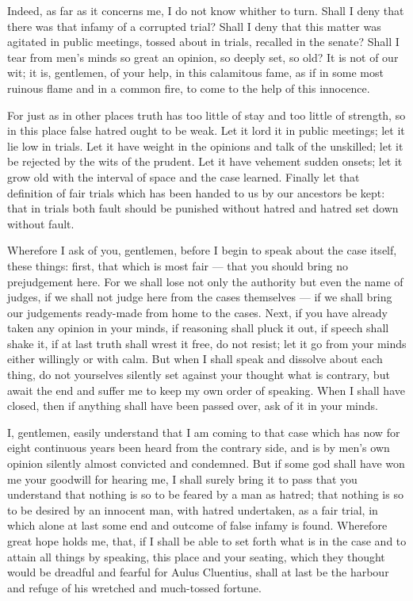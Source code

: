  Indeed, as far as it concerns me, I do not know whither to turn. Shall I deny that there was that infamy of a corrupted trial? Shall I deny that this matter was agitated in public meetings, tossed about in trials, recalled in the senate? Shall I tear from men's minds so great an opinion, so deeply set, so old? It is not of our wit; it is, gentlemen, of your help, in this calamitous fame, as if in some most ruinous flame and in a common fire, to come to the help of this innocence.

 For just as in other places truth has too little of stay and too little of strength, so in this place false hatred ought to be weak. Let it lord it in public meetings; let it lie low in trials. Let it have weight in the opinions and talk of the unskilled; let it be rejected by the wits of the prudent. Let it have vehement sudden onsets; let it grow old with the interval of space and the case learned. Finally let that definition of fair trials which has been handed to us by our ancestors be kept: that in trials both fault should be punished without hatred and hatred set down without fault.

 Wherefore I ask of you, gentlemen, before I begin to speak about the case itself, these things: first, that which is most fair --- that you should bring no prejudgement here. For we shall lose not only the authority but even the name of judges, if we shall not judge here from the cases themselves --- if we shall bring our judgements ready-made from home to the cases. Next, if you have already taken any opinion in your minds, if reasoning shall pluck it out, if speech shall shake it, if at last truth shall wrest it free, do not resist; let it go from your minds either willingly or with calm. But when I shall speak and dissolve about each thing, do not yourselves silently set against your thought what is contrary, but await the end and suffer me to keep my own order of speaking. When I shall have closed, then if anything shall have been passed over, ask of it in your minds.

 I, gentlemen, easily understand that I am coming to that case which has now for eight continuous years been heard from the contrary side, and is by men's own opinion silently almost convicted and condemned. But if some god shall have won me your goodwill for hearing me, I shall surely bring it to pass that you understand that nothing is so to be feared by a man as hatred; that nothing is so to be desired by an innocent man, with hatred undertaken, as a fair trial, in which alone at last some end and outcome of false infamy is found. Wherefore great hope holds me, that, if I shall be able to set forth what is in the case and to attain all things by speaking, this place and your seating, which they thought would be dreadful and fearful for Aulus Cluentius, shall at last be the harbour and refuge of his wretched and much-tossed fortune.

